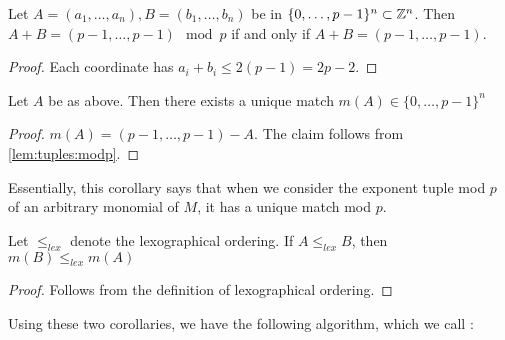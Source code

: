 \begin{lem}
	\label{lem:tuples:modp}
	Let \(A = (a_{1}, \ldots, a_{n}),
	B = (b_{1}, \ldots, b_{n})\)
	be in \(\{0, \ldots, p-1\}^{n} \subset \mathbb{Z}^{n}\).
	Then \(A + B = 
	(p-1, \ldots, p-1) \mod p\)
	if and only if 
	\(A + B = 
	(p-1, \ldots, p-1)\).
\end{lem}

\begin{proof}
	Each coordinate has \(a_{i} + b_{i} \leq 2(p-1) = 2p-2\).
\end{proof}

\begin{cor}
    \label{cor:unique:match}
	Let $A$ be as above.
	Then there exists a unique
	match \(m(A) \in \{0, \ldots, p-1\}^{n}\) 
\end{cor}

\begin{proof}
	\(m(A) = 
	(p-1, \ldots, p-1) - A\).
	The claim follows from 
	\ref{lem:tuples:modp}.
\end{proof}

Essentially, this corollary says that
when we consider the exponent tuple mod $p$ of 
an arbitrary monomial of \(M\),
it has a unique
match mod \(p\).

\begin{cor}
	\label{cor:match:order}
	Let \(\leq_{lex}\) denote the 
	lexographical ordering.
	If \(A \leq_{lex} B\),
	then 
	\(m(B) \leq_{lex} m(A)\)
\end{cor}

\begin{proof}
	Follows from the definition of lexographical
	ordering.
\end{proof}

Using these two corollaries, we have the following algorithm,
which we call \merge:

